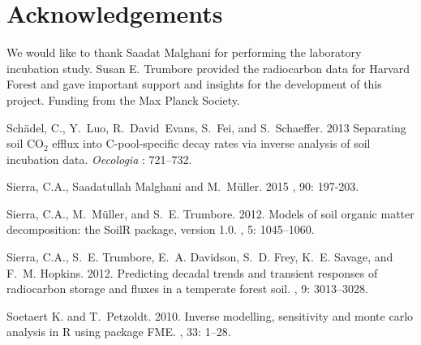 \documentclass[a4paper]{article}\usepackage[]{graphicx}\usepackage[]{color}
\begin{document}
\clearpage
\section*{Acknowledgements}
We would like to thank Saadat Malghani for performing the laboratory incubation study. Susan E. Trumbore provided the radiocarbon data for Harvard Forest and gave important support and insights for the development of this project. Funding from the Max Planck Society. 

\begin{thebibliography}{9}
 Sch{\"a}del, C., Y.~Luo, R.~David~Evans, S.~Fei, and S.~Schaeffer. 2013
\newblock Separating soil {CO$_2$} efflux into {C}-pool-specific decay rates
  via inverse analysis of soil incubation data. {\it Oecologia} : 721--732.

 Sierra, C.A., Saadatullah Malghani and  M.~M\"uller. 2015 
	, 90: 197-203.

 Sierra, C.A., M.~M\"uller, and S.~E. Trumbore. 2012. \newblock Models of soil organic matter decomposition: the {SoilR} package, version 1.0. , 5: 1045--1060.

 Sierra, C.A., S.~E. Trumbore, E.~A. Davidson, S.~D. Frey, K.~E. Savage, and  F.~M. Hopkins. 2012.
\newblock Predicting decadal trends and transient responses of radiocarbon storage and fluxes in a temperate forest soil.
, 9: 3013--3028.

 Soetaert K. and T.~Petzoldt. 2010. \newblock Inverse modelling, sensitivity and monte carlo analysis in R using   package FME. , 33: 1--28.

\end{thebibliography}
\end{document}

